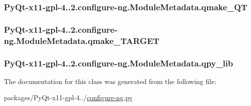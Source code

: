 \subsubsection[{qmake\+\_\+\+Q\+T}]{\setlength{\rightskip}{0pt plus 5cm}Py\+Qt-\/x11-\/gpl-\/4..\+2.configure-\/ng.\+Module\+Metadata.\+qmake\+\_\+\+Q\+T}\label{classPyQt-x11-gpl-4_811_82_1_1configure-ng_1_1ModuleMetadata_a19243d37905eed079d7a2cf0c0303753}
\hypertarget{classPyQt-x11-gpl-4_811_82_1_1configure-ng_1_1ModuleMetadata_a39ee37141e55cd858cb19665e867ff38}{}
\subsubsection[{qmake\+\_\+\+T\+A\+R\+G\+E\+T}]{\setlength{\rightskip}{0pt plus 5cm}Py\+Qt-\/x11-\/gpl-\/4..\+2.configure-\/ng.\+Module\+Metadata.\+qmake\+\_\+\+T\+A\+R\+G\+E\+T}\label{classPyQt-x11-gpl-4_811_82_1_1configure-ng_1_1ModuleMetadata_a39ee37141e55cd858cb19665e867ff38}
\hypertarget{classPyQt-x11-gpl-4_811_82_1_1configure-ng_1_1ModuleMetadata_aebe8e6a37ab34315a37e64545c918eab}{}
\subsubsection[{qpy\+\_\+lib}]{\setlength{\rightskip}{0pt plus 5cm}Py\+Qt-\/x11-\/gpl-\/4..\+2.configure-\/ng.\+Module\+Metadata.\+qpy\+\_\+lib}\label{classPyQt-x11-gpl-4_811_82_1_1configure-ng_1_1ModuleMetadata_aebe8e6a37ab34315a37e64545c918eab}


The documentation for this class was generated from the following file\+:\begin{DoxyCompactItemize}
\item 
packages/\+Py\+Qt-\/x11-\/gpl-\/4../\hyperlink{configure-ng_8py}{configure-\/ng.\+py}\end{DoxyCompactItemize}
